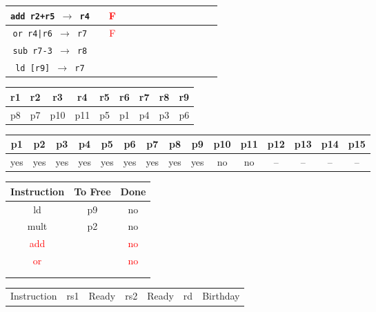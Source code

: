 \documentclass[12pt]{article}
\begin{document}
\begin{enumerate}
\begin{table}[H]
\begin{tabular}{|c|c|c|c|c|c|c|c|c|c|c|c|c|}
					\hline
					\texttt{add r2+r5 $\rightarrow$ r4} &  & \textcolor{red}{F} &  &  &  &  &  &  &  &  &  &\\
					\hline
					\texttt{or r4|r6 $\rightarrow$ r7} &  & \textcolor{red}{F} &  &  &  &  &  &  &  &  &  &\\
					\hline
					\texttt{sub r7-3 $\rightarrow$ r8} &  &  &  &  &  &  &  &  &  &  &  &\\
					\hline
					\texttt{ld [r9] $\rightarrow$ r7} &  &  &  &  &  &  &  &  &  &  &  &\\
					\hline 
				\end{tabular}
			\end{table}
			\begin{table}[H]
				\begin{tabular}{|c|c|c|c|c|c|c|c|c|}
					\hline
					r1 & r2 & r3 & r4 & r5 & r6 & r7 & r8 & r9\\
					\hline
					p8 & p7 & p10 & p11 & p5 & p1 & p4 & p3 & p6\\
					\hline
				\end{tabular}
			\end{table}
			\begin{table}[H]
				\begin{tabular}{|c|c|c|c|c|c|c|c|c|c|c|c|c|c|c|}
					\hline
					p1 & p2 & p3 & p4 & p5 & p6 & p7 & p8 & p9 & p10 & p11 & p12 & p13 & p14 & p15\\
					\hline
					yes & yes & yes & yes & yes & yes & yes & yes & yes & no & no & -- & -- & -- & --\\
					\hline
				\end{tabular}
			\end{table}
			\begin{table}[H]
				\begin{tabular}{|c|c|c|}
					\hline
					Instruction & To Free & Done\\
					\hline
					ld & p9 & no\\
					\hline
					mult & p2 & no\\
					\hline
					\textcolor{red}{add} & & \textcolor{red}{no}\\
					\hline
					\textcolor{red}{or} & & \textcolor{red}{no}\\
					\hline
					 & & \\
					\hline
					 & & \\
					\hline
				\end{tabular}
				\hfill
				\begin{tabular}{|c|c|c|c|c|c|c|}
					\hline
					Instruction & rs1 & Ready & rs2 & Ready & rd & Birthday\\

\end{tabular}
\end{table}
\end{enumerate}
\end{document}
